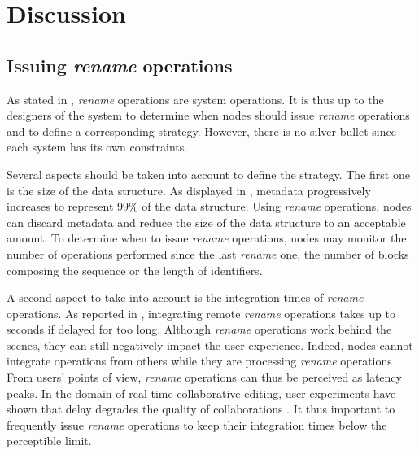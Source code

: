 \documentclass[10pt,journal,compsoc]{IEEEtran}
\begin{document}

\section{Discussion}

\label{sec:discussion}

\subsection{Issuing \emph{rename} operations}
\label{sec:issuing-rename-operations}

As stated in , \emph{rename} operations are system operations.
It is thus up to the designers of the system to determine when nodes should issue \emph{rename} operations and to define a corresponding strategy.
However, there is no silver bullet since each system has its own constraints.

Several aspects should be taken into account to define the strategy.
The first one is the size of the data structure.
As displayed in , metadata progressively increases to represent 99\% of the data structure.
Using \emph{rename} operations, nodes can discard metadata and reduce the size of the data structure to an acceptable amount.
To determine when to issue \emph{rename} operations, nodes may monitor the number of operations performed since the last \emph{rename} one, the number of blocks composing the sequence or the length of identifiers.

A second aspect to take into account is the integration times of \emph{rename} operations.
As reported in , integrating remote \emph{rename} operations takes up to seconds if delayed for too long.
Although \emph{rename} operations work behind the scenes, they can still negatively impact the user experience.
Indeed, nodes cannot integrate operations from others while they are processing \emph{rename} operations
From users' points of view, \emph{rename} operations can thus be perceived as latency peaks.
In the domain of real-time collaborative editing, user experiments have shown that delay degrades the quality of collaborations \cite{ignat:hal-01088815,ignat:hal-01238831}.
It thus important to frequently issue \emph{rename} operations to keep their integration times below the perceptible limit.
\end{document}
